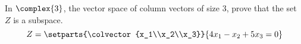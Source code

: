 In $\complex{3}$, the vector space of column vectors of size 3, prove that the set $Z$ is a subspace.
%
\begin{equation*}
Z=\setparts{\colvector{x_1\\x_2\\x_3}}{4x_1-x_2+5x_3=0}
\end{equation*}
%